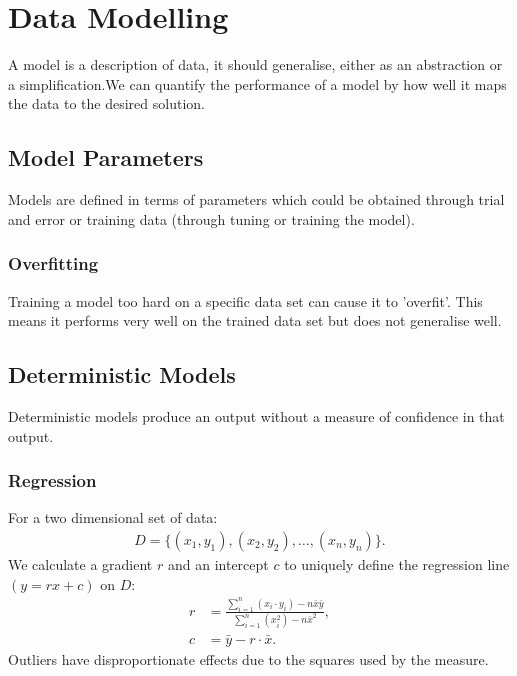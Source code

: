 \section{Data Modelling}

A model is a description of data, it should generalise, either as 
an abstraction or a simplification.We can quantify the performance 
of a model by how well it maps the data to the desired solution.

\subsection{Model Parameters}

Models are defined in terms of parameters which could be obtained
through trial and error or training data (through tuning or
training the model).

\subsubsection{Overfitting}

Training a model too hard on a specific data set can cause it
to 'overfit'. This means it performs very well on the trained
data set but does not generalise well.

\subsection{Deterministic Models}

Deterministic models produce an output without a measure of
confidence in that output.

\subsubsection{Regression}

For a two dimensional set of data: \begin{gather*}
    D = \{(x_1, y_1), (x_2, y_2), \ldots, (x_n, y_n)\}.
\end{gather*} We calculate a gradient $r$ and an intercept $c$ to 
uniquely define the regression line $(y = rx + c)$ on $D$: \begin{align*}
    r &= \frac{
        \sum_{i = 1}^n (x_i \cdot y_i) - n\bar{x}\bar{y}
    }{
        \sum_{i = 1}^n (x_i^2) - n\bar{x}^2
    }, \\
    c &= \bar{y} - r \cdot \bar{x}.
\end{align*} Outliers have disproportionate effects due to the
squares used by the measure. 

